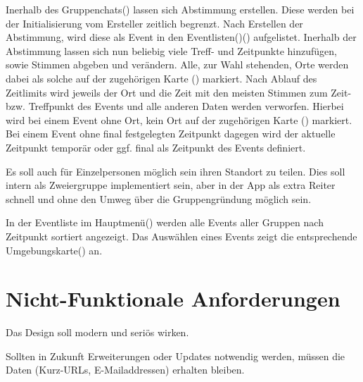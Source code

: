 \documentclass[parskip=full,11pt]{scrartcl}
\begin{document}
Inerhalb des Gruppenchats() lassen sich Abstimmung erstellen. Diese werden bei
der Initialisierung vom Ersteller zeitlich begrenzt. Nach Erstellen der Abstimmung, wird diese als Event in den
Eventlisten()() aufgelistet.
Inerhalb der Abstimmung lassen sich nun beliebig viele Treff- und Zeitpunkte hinzufügen,
sowie Stimmen abgeben und verändern. Alle, zur Wahl stehenden, Orte werden dabei als solche auf der zugehörigen
Karte () markiert. Nach Ablauf des Zeitlimits wird jeweils der Ort und die
Zeit mit den meisten Stimmen zum Zeit- bzw. Treffpunkt des Events und alle anderen Daten werden verworfen.
Hierbei wird bei einem Event ohne Ort, kein Ort auf der zugehörigen
Karte () markiert. Bei einem Event ohne final festgelegten Zeitpunkt
dagegen wird der aktuelle Zeitpunkt temporär oder ggf. final als Zeitpunkt des Events definiert.

Es soll auch für Einzelpersonen möglich sein ihren Standort zu teilen.
Dies soll intern als Zweiergruppe implementiert sein, aber in der App als extra Reiter schnell
und ohne den Umweg über die Gruppengründung möglich sein.

In der Eventliste im Hauptmenü() werden alle Events aller Gruppen nach
Zeitpunkt sortiert angezeigt. Das Auswählen eines Events zeigt die entsprechende
Umgebungskarte() an.

\section{Nicht-Funktionale Anforderungen}


Das Design soll modern und seriös wirken.


Sollten in Zukunft Erweiterungen oder Updates notwendig werden,
müssen die Daten (Kurz-URLs, E-Mailaddressen) erhalten bleiben.

\end{document}
